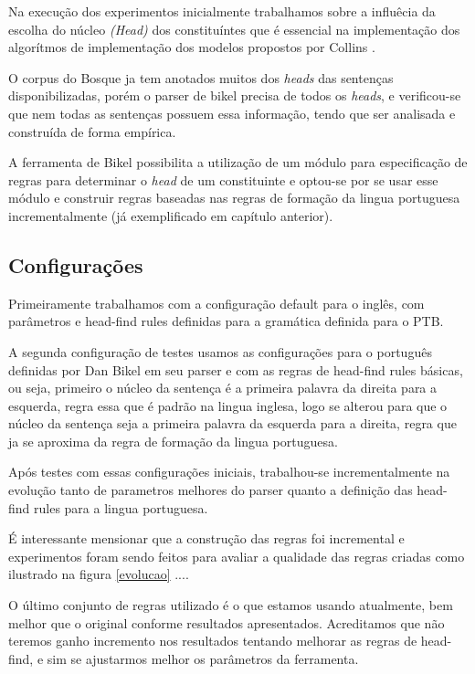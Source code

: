 Na execução dos experimentos inicialmente trabalhamos sobre a influêcia da escolha do núcleo \emph{(Head)} dos constituíntes que é essencial na implementação dos algorítmos de implementação dos modelos propostos por Collins \cite{collins99}.

O corpus do Bosque ja tem anotados muitos dos \emph{heads} das sentenças disponibilizadas, porém o parser de bikel precisa de todos os \emph{heads}, e verificou-se que nem todas as sentenças possuem essa informação, tendo que ser analisada e construída de forma empírica.

A ferramenta de Bikel possibilita a utilização de um módulo para especificação de regras para determinar o \emph{head} de um constituinte e optou-se por se usar esse módulo e construir regras baseadas nas regras de formação da lingua portuguesa incrementalmente (já exemplificado em capítulo anterior). 

\subsection{Configurações}
\label{sec:configuracoes}

Primeiramente trabalhamos com a configuração default para o inglês, com parâmetros e head-find rules definidas para a gramática definida para o PTB. 

A segunda configuração de testes usamos as configurações para o português definidas por Dan Bikel em seu parser e com as regras de head-find rules básicas, ou seja, primeiro o núcleo da sentença é a primeira palavra da direita para a esquerda, regra essa que é padrão na lingua inglesa, logo se alterou para que o núcleo da sentença seja a primeira palavra da esquerda para a direita, regra que ja se aproxima da regra de formação da lingua portuguesa. 

Após testes com essas configurações iniciais, trabalhou-se incrementalmente na evolução tanto de parametros melhores do parser quanto a definição das head-find rules para a lingua portuguesa.

É interessante mensionar que a construção das regras foi incremental e experimentos foram sendo feitos para avaliar a qualidade das regras criadas como ilustrado na figura \ref{evolucao} ....


O último conjunto de regras utilizado é o que estamos usando atualmente, bem melhor que o original conforme resultados apresentados. Acreditamos que não teremos ganho incremento nos resultados tentando melhorar as regras de head-find, e sim se ajustarmos melhor os parâmetros da ferramenta.


